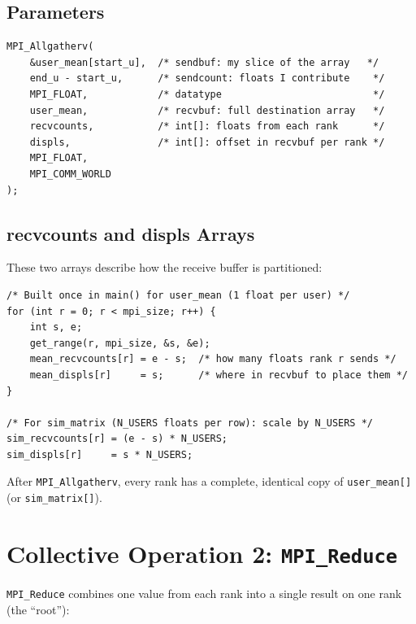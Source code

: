 \documentclass[12pt,a4paper]{article}
\begin{document}
\subsection{Parameters}

\begin{lstlisting}
MPI_Allgatherv(
    &user_mean[start_u],  /* sendbuf: my slice of the array   */
    end_u - start_u,      /* sendcount: floats I contribute    */
    MPI_FLOAT,            /* datatype                          */
    user_mean,            /* recvbuf: full destination array   */
    recvcounts,           /* int[]: floats from each rank      */
    displs,               /* int[]: offset in recvbuf per rank */
    MPI_FLOAT,
    MPI_COMM_WORLD
);
\end{lstlisting}

\subsection{recvcounts and displs Arrays}

These two arrays describe how the receive buffer is partitioned:

\begin{lstlisting}
/* Built once in main() for user_mean (1 float per user) */
for (int r = 0; r < mpi_size; r++) {
    int s, e;
    get_range(r, mpi_size, &s, &e);
    mean_recvcounts[r] = e - s;  /* how many floats rank r sends */
    mean_displs[r]     = s;      /* where in recvbuf to place them */
}

/* For sim_matrix (N_USERS floats per row): scale by N_USERS */
sim_recvcounts[r] = (e - s) * N_USERS;
sim_displs[r]     = s * N_USERS;
\end{lstlisting}

After \texttt{MPI\_Allgatherv}, every rank has a complete, identical copy
of \texttt{user\_mean[]} (or \texttt{sim\_matrix[]}).

\section{Collective Operation 2: \texttt{MPI\_Reduce}}

\texttt{MPI\_Reduce} combines one value from each rank into a single result
on one rank (the ``root''):
\end{document}
